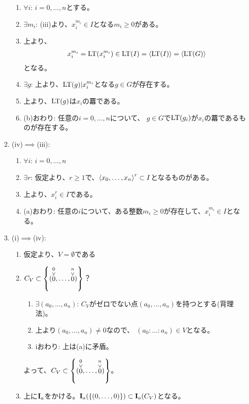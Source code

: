 \begin{myproof}
\begin{enumerate}
\begin{enumerate}
      \item $\forall i$: $i=0,\dots,n$とする。
      \item $\exists m_i$:
      (iii)より、$x_i^{m_i} \in I$となる$m_i \ge 0$がある。
      \item
      上より、
      \begin{align}
        x_i^{m_i}= {\rm LT}(x_i^{m_i}) \in {\rm LT}(I) = \left\langle {\rm LT}(I) \right\rangle = \left\langle {\rm LT}(G) \right\rangle
      \end{align}
      となる。
      \item $\exists g$:
      上より、${\rm LT}(g) | x_i^{m_i}$となる$g\in G$が存在する。
      \item
      上より、${\rm LT}(g)$は$x_i$の羃である。
      \item (b)おわり: 任意の$i=0,\dots,n$について、
      $g \in G$で${\rm LT}(g_i)$が$x_i$の羃であるものが存在する。
    \end{enumerate}
    \item (iv)$\implies$(iii):
    \begin{enumerate}
      \item $\forall i$: $i=0,\dots,n$
      \item $\exists r$: 仮定より、$r\ge 1$で、$\left\langle x_0,\dots,x_n \right\rangle^r \subset I$となるものがある。
      \item
      上より、$x_i^r \in I$である。
      \item
      (a)おわり: 任意の$i$について、ある整数$m_i \ge 0$が存在して、$x_i^{m_i} \in I$となる。
    \end{enumerate}
    \item (i)$\implies$(iv):
    \begin{enumerate}
      \item 仮定より、$V=\emptyset$である
      \item
      $C_V \subset \left\{(\stackrel{0}{\stackrel{\vee}{0}},\dots,\stackrel{n}{\stackrel{\vee}{0}})\right\}$？
      \begin{enumerate}
        \item $\exists (a_0,\dots,a_n)$:
        $C_V$がゼロでない点$(a_0,\dots,a_n)$を持つとする(背理法)。
        \item
        上より$(a_0,\dots,a_n) \neq 0$なので、
        $(a_0:\dots:a_n) \in V$となる。
        \item iおわり:
        上は(a)に矛盾。
      \end{enumerate}
      よって、$C_V \subset \left\{(\stackrel{0}{\stackrel{\vee}{0}},\dots,\stackrel{n}{\stackrel{\vee}{0}})\right\}$。
      \item
      上に$\textbf I_a$をかける。$\textbf I_a(\left\{(0,\dots,0)\right\})\subset \textbf I_a(C_V)$となる。

\end{enumerate}
\end{enumerate}
\end{myproof}
